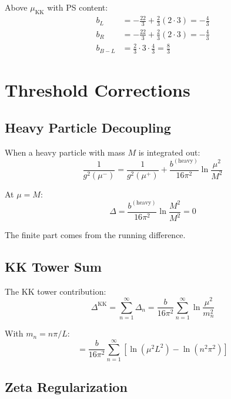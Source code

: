 \documentclass[11pt,a4paper]{article}
\begin{document}
Above $\mu_{\text{KK}}$ with PS content:
\begin{align}
\label{eq:bL-ps-app}
b_L &= -\frac{22}{3} + \frac{2}{3}(2 \cdot 3) = -\frac{4}{3} \\
\label{eq:bR-ps-app}
b_R &= -\frac{22}{3} + \frac{2}{3}(2 \cdot 3) = -\frac{4}{3} \\
\label{eq:bBL-ps-app}
b_{B-L} &= \frac{2}{3} \cdot 3 \cdot \frac{4}{3} = \frac{8}{3}
\end{align}

\section{Threshold Corrections}
\label{app:threshold-app}

\subsection{Heavy Particle Decoupling}
\label{app:decoupling}

When a heavy particle with mass $M$ is integrated out:
\begin{equation}
\label{eq:decoupling-threshold}
\frac{1}{g^2(\mu^-)} = \frac{1}{g^2(\mu^+)} + \frac{b^{(\text{heavy})}}{16\pi^2}\ln\frac{\mu^2}{M^2}
\end{equation}

At $\mu = M$:
\begin{equation}
\label{eq:threshold-at-M}
\Delta = \frac{b^{(\text{heavy})}}{16\pi^2}\ln\frac{M^2}{M^2} = 0
\end{equation}

The finite part comes from the running difference.

\subsection{KK Tower Sum}
\label{app:kk-tower}

The KK tower contribution:
\begin{equation}
\label{eq:kk-tower-sum}
\Delta^{\text{KK}} = \sum_{n=1}^{\infty}\Delta_n = \frac{b}{16\pi^2}\sum_{n=1}^{\infty}\ln\frac{\mu^2}{m_n^2}
\end{equation}

With $m_n = n\pi/L$:
\begin{equation}
\label{eq:kk-sum-explicit}
= \frac{b}{16\pi^2}\sum_{n=1}^{\infty}\left[\ln(\mu^2 L^2) - \ln(n^2\pi^2)\right]
\end{equation}

\subsection{Zeta Regularization}
\label{app:zeta}
\end{document}
